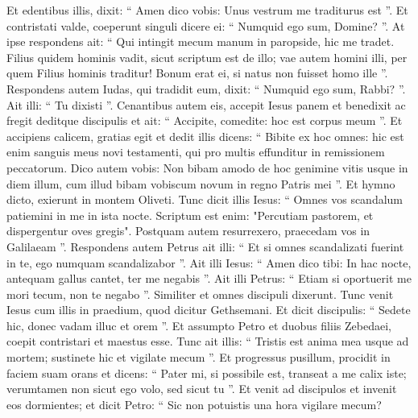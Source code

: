 \begin{biblechapter}
\begin{biblechapter}
\begin{biblechapter}
\begin{biblechapter}
\begin{biblechapter}
\begin{biblechapter}
\begin{biblechapter}
\begin{biblechapter}
\begin{biblechapter}
\begin{biblechapter}
\begin{biblechapter}
\begin{biblechapter}
\begin{biblechapter}
\begin{biblechapter}
\begin{biblechapter}
\begin{biblechapter}
\begin{biblechapter}
\begin{biblechapter}
\begin{biblechapter}
\begin{biblechapter}
\begin{biblechapter}
\begin{biblechapter}
\begin{biblechapter}
\begin{biblechapter}
\begin{biblechapter}
\begin{biblechapter}
\verse Et edentibus illis, dixit: “ Amen dico vobis: Unus vestrum me traditurus est ”. 
\verse Et contristati valde, coeperunt singuli dicere ei: “ Numquid ego sum, Domine? ”. 
 \verse At ipse respondens ait: “ Qui intingit mecum manum in paropside, hic me tradet. 
\verse Filius quidem hominis vadit, sicut scriptum est de illo; vae autem homini illi, per quem Filius hominis traditur! Bonum erat ei, si natus non fuisset homo ille ”. 
\verse Respondens autem Iudas, qui tradidit eum, dixit: “ Numquid ego sum, Rabbi? ”. Ait illi: “ Tu dixisti ”.
 \verse Cenantibus autem eis, accepit Iesus panem et benedixit ac fregit deditque discipulis et ait: “ Accipite, comedite: hoc est corpus meum ”. 
\verse Et accipiens calicem, gratias egit et dedit illis dicens: “ Bibite ex hoc omnes: 
\verse hic est enim sanguis meus novi testamenti, qui pro multis effunditur in remissionem peccatorum. 
\verse Dico autem vobis: Non bibam amodo de hoc genimine vitis usque in diem illum, cum illud bibam vobiscum novum in regno Patris mei ”.
 \verse Et hymno dicto, exierunt in montem Oliveti. 
\verse Tunc dicit illis Iesus: “ Omnes vos scandalum patiemini in me in ista nocte. Scriptum est enim: "Percutiam pastorem, et dispergentur oves gregis". 
\verse Postquam autem resurrexero, praecedam vos in Galilaeam ”. 
\verse Respondens autem Petrus ait illi: “ Et si omnes scandalizati fuerint in te, ego numquam scandalizabor ”. 
\verse Ait illi Iesus: “ Amen dico tibi: In hac nocte, antequam gallus cantet, ter me negabis ”. 
\verse Ait illi Petrus: “ Etiam si oportuerit me mori tecum, non te negabo ”. Similiter et omnes discipuli dixerunt.
 \verse Tunc venit Iesus cum illis in praedium, quod dicitur Gethsemani. Et dicit discipulis: “ Sedete hic, donec vadam illuc et orem ”. 
\verse Et assumpto Petro et duobus filiis Zebedaei, coepit contristari et maestus esse. 
\verse Tunc ait illis: “ Tristis est anima mea usque ad mortem; sustinete hic et vigilate mecum ”. 
\verse Et progressus pusillum, procidit in faciem suam orans et dicens: “ Pater mi, si possibile est, transeat a me calix iste; verumtamen non sicut ego volo, sed sicut tu ”. 
\verse Et venit ad discipulos et invenit eos dormientes; et dicit Petro: “ Sic non potuistis una hora vigilare mecum? 

\end{biblechapter}
\end{biblechapter}
\end{biblechapter}
\end{biblechapter}
\end{biblechapter}
\end{biblechapter}
\end{biblechapter}
\end{biblechapter}
\end{biblechapter}
\end{biblechapter}
\end{biblechapter}
\end{biblechapter}
\end{biblechapter}
\end{biblechapter}
\end{biblechapter}
\end{biblechapter}
\end{biblechapter}
\end{biblechapter}
\end{biblechapter}
\end{biblechapter}
\end{biblechapter}
\end{biblechapter}
\end{biblechapter}
\end{biblechapter}
\end{biblechapter}
\end{biblechapter}
